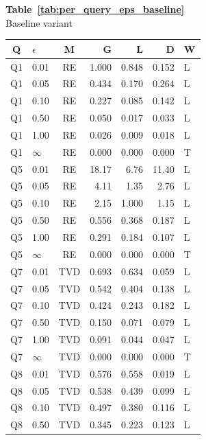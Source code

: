 \documentclass[12pt,letterpaper]{article}
\begin{document}
\vspace{0.2em}
\begin{table}[H]
\centering
\setlength{\tabcolsep}{1.8pt}
\renewcommand{\arraystretch}{0.74}
\begin{minipage}[t]{0.48\textwidth}
\centering
\scriptsize\noindent\textbf{Table~\ref{tab:per_query_eps_baseline}}\\
\scriptsize Baseline variant\\[0.35em]
\scriptsize
\begin{tabular}{@{}clcrrrl@{}}
\toprule
\textbf{Q} & \textbf{$\epsilon$} & \textbf{M} & \textbf{G} & \textbf{L} & \textbf{D} & \textbf{W} \\
\midrule
Q1 & 0.01 & RE & 1.000 & 0.848 & 0.152 & L \\
Q1 & 0.05 & RE & 0.434 & 0.170 & 0.264 & L \\
Q1 & 0.10 & RE & 0.227 & 0.085 & 0.142 & L \\
Q1 & 0.50 & RE & 0.050 & 0.017 & 0.033 & L \\
Q1 & 1.00 & RE & 0.026 & 0.009 & 0.018 & L \\
Q1 & $\infty$ & RE & 0.000 & 0.000 & 0.000 & T \\
\midrule
Q5 & 0.01 & RE & 18.17 & 6.76 & 11.40 & L \\
Q5 & 0.05 & RE & 4.11 & 1.35 & 2.76 & L \\
Q5 & 0.10 & RE & 2.15 & 1.000 & 1.15 & L \\
Q5 & 0.50 & RE & 0.556 & 0.368 & 0.187 & L \\
Q5 & 1.00 & RE & 0.291 & 0.184 & 0.107 & L \\
Q5 & $\infty$ & RE & 0.000 & 0.000 & 0.000 & T \\
\midrule
Q7 & 0.01 & TVD & 0.693 & 0.634 & 0.059 & L \\
Q7 & 0.05 & TVD & 0.542 & 0.404 & 0.138 & L \\
Q7 & 0.10 & TVD & 0.424 & 0.243 & 0.182 & L \\
Q7 & 0.50 & TVD & 0.150 & 0.071 & 0.079 & L \\
Q7 & 1.00 & TVD & 0.091 & 0.044 & 0.047 & L \\
Q7 & $\infty$ & TVD & 0.000 & 0.000 & 0.000 & T \\
\midrule
Q8 & 0.01 & TVD & 0.576 & 0.558 & 0.019 & L \\
Q8 & 0.05 & TVD & 0.538 & 0.439 & 0.099 & L \\
Q8 & 0.10 & TVD & 0.497 & 0.380 & 0.116 & L \\
Q8 & 0.50 & TVD & 0.345 & 0.223 & 0.123 & L \\

\end{tabular}
\end{minipage}
\end{table}
\end{document}
